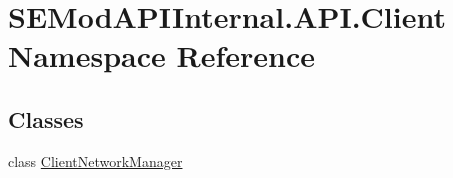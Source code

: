\hypertarget{namespace_s_e_mod_a_p_i_internal_1_1_a_p_i_1_1_client}{}\section{S\+E\+Mod\+A\+P\+I\+Internal.\+A\+P\+I.\+Client Namespace Reference}
\label{namespace_s_e_mod_a_p_i_internal_1_1_a_p_i_1_1_client}
\subsection*{Classes}
\begin{DoxyCompactItemize}
\item 
class \hyperlink{class_s_e_mod_a_p_i_internal_1_1_a_p_i_1_1_client_1_1_client_network_manager}{Client\+Network\+Manager}
\end{DoxyCompactItemize}
